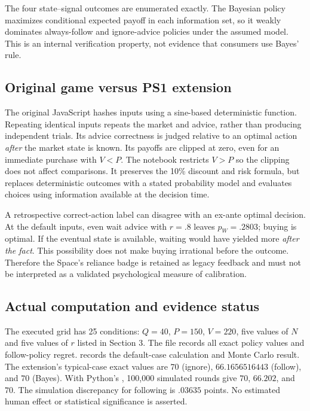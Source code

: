 The four state--signal outcomes are enumerated exactly. The Bayesian policy maximizes conditional expected payoff in each information set, so it weakly dominates always-follow and ignore-advice policies under the assumed model. This is an internal verification property, not evidence that consumers use Bayes' rule.

\subsection{Original game versus PS1 extension}
The original JavaScript hashes inputs using a sine-based deterministic function. Repeating identical inputs repeats the market and advice, rather than producing independent trials. Its advice correctness is judged relative to an optimal action \emph{after} the market state is known. Its payoffs are clipped at zero, even for an immediate purchase with $V<P$. The notebook restricts $V>P$ so the clipping does not affect comparisons. It preserves the 10\% discount and risk formula, but replaces deterministic outcomes with a stated probability model and evaluates choices using information available at the decision time.

A retrospective correct-action label can disagree with an ex-ante optimal decision. At the default inputs, even wait advice with $r=.8$ leaves $p_W=.2803$; buying is optimal. If the eventual state is available, waiting would have yielded more \emph{after the fact}. This possibility does not make buying irrational before the outcome. Therefore the Space's reliance badge is retained as legacy feedback and must not be interpreted as a validated psychological measure of calibration.

\subsection{Actual computation and evidence status}
The executed grid has 25 conditions: $Q=40$, $P=150$, $V=220$, five values of $N$ and five values of $r$ listed in Section 3. The file  records all exact policy values and follow-policy regret.  records the default-case calculation and Monte Carlo result. The extension's typical-case exact values are $70$ (ignore), $66.1656516443$ (follow), and $70$ (Bayes). With Python's , 100,000 simulated rounds give $70$, $66.202$, and $70$. The simulation discrepancy for following is $.03635$ points. No estimated human effect or statistical significance is asserted.

